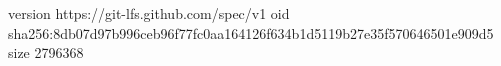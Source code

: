 version https://git-lfs.github.com/spec/v1
oid sha256:8db07d97b996ceb96f77fc0aa164126f634b1d5119b27e35f570646501e909d5
size 2796368
